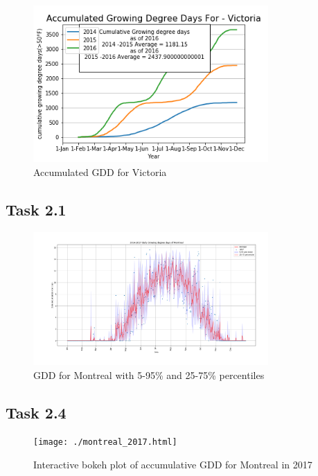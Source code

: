 \documentclass[12pt]{article}
\begin{document}
\begin{figure}[!htbp]
\centering
\includegraphics[width=0.8\textwidth]{./docs/VictoriaGDD.png} 
\caption{\scriptsize Accumulated GDD for Victoria}
\label{accuGDD_3}		  
\end{figure}	

\pagebreak 	

\subsection{Task 2.1}
\begin{figure}[!htbp]
\centering
\includegraphics[width=0.8\textwidth]{./docs/task1.png} 
\caption{\scriptsize GDD for Montreal with 5-95\% and 25-75\% percentiles}
\label{GDDwCI}		  
\end{figure}

\pagebreak
\subsection{Task 2.4}
\begin{figure}[!htbp]
\centering
\texttt{[image: ./montreal\_2017.html]} 
\caption{\scriptsize Interactive bokeh plot of accumulative GDD for Montreal in 2017}
\label{bokeh}		  
\end{figure}
\end{document}
